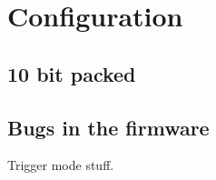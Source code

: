 \section{Configuration}

\subsection{10 bit packed}

\subsection{Bugs in the firmware}
Trigger mode stuff.